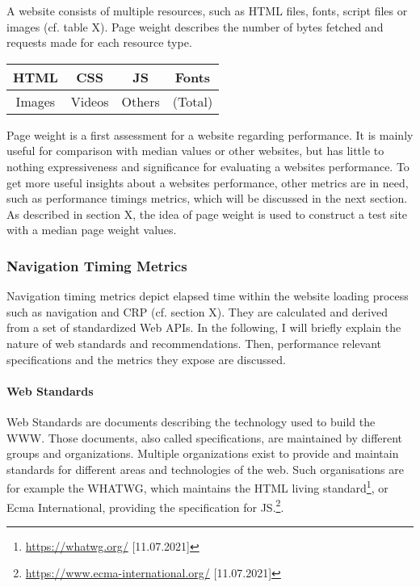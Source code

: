 A website consists of multiple resources, such as HTML files, fonts, script files or images (cf. table X).
Page weight describes the number of bytes fetched and requests made for each resource type. %

\begin{center}
\begin{tabular}{| c | c | c | c | }
\hline
HTML & CSS  & JS & Fonts \\
\hline
Images & Videos & Others & (Total) \\
\hline
\end{tabular}
\end{center}

Page weight is a first assessment for a website regarding performance.
It is mainly useful for comparison with median values or other websites, but has little to nothing expressiveness and significance for evaluating a websites performance.
To get more useful insights about a websites performance, other metrics are in need, such as performance timings metrics, which will be discussed in the next section.
As described in section X,  the idea of page weight is used to construct a test site with a median page weight values.




\subsubsection{Navigation Timing Metrics}

Navigation timing metrics depict elapsed time within the website loading process such as navigation and CRP (cf.  section X).
They are calculated and derived from a set of standardized Web APIs.
In the following, I will briefly explain the nature of web standards and recommendations.
Then, performance relevant specifications and the metrics they expose are discussed.


\paragraph{Web Standards}

Web Standards are documents describing the technology used to build the WWW. %
Those documents, also called specifications, are maintained by different groups and organizations.
Multiple organizations exist to provide and maintain standards for different areas and technologies of the web.
Such organisations are for example the WHATWG, which maintains the HTML living standard\footnote{\url{https://whatwg.org/} [11.07.2021]}, or Ecma International, providing the specification for JS.\footnote{\url{https://www.ecma-international.org/} [11.07.2021]}.

